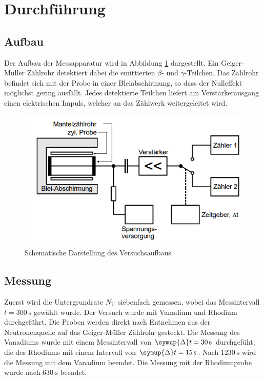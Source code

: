 \section{Durchführung}
\label{sec:Durchführung}
\subsection{Aufbau}
Der Aufbau der Messapparatur wird in Abbildung \ref{fig:auf} dargestellt. Ein Geiger-Müller Zählrohr detektiert dabei die emittierten $\beta$- und $\gamma$-Teilchen.
Das Zählrohr befindet sich mit der Probe in einer Bleiabschirmung, so dass der Nulleffekt möglichst gering ausfällt. Jedes detektierte Teilchen liefert am Verstärkerausgang einen elektrischen Impuls, welcher an das Zählwerk weitergeleitet wird.  
\begin{figure}
    \centering
    \includegraphics[scale=0.6]{content/Aufbau.png}
    \caption{Schematische Darstellung des Versuchsaufbaus \cite{v703}}
    \label{fig:auf}
  \end{figure}
  \subsection{Messung}
  Zuerst wird die Untergrundrate $N_\text{U}$ siebenfach gemessen, wobei das Messintervall $t=\SI{300}{\second}$ gewählt wurde. 
  Der Versuch wurde mit Vanadium und Rhodium durchgeführt. Die Proben werden direkt nach Entnehmen aus der Neutronenquelle auf das Geiger-Müller Zählrohr gesteckt.
  Die Messung des Vanadiums wurde mit einem Messintervall von $\symup{\Delta}t=\SI{30}{\second}$ durchgefüht;
  die des Rhodiums mit einem Intervall von $\symup{\Delta}t=\SI{15}{\second}$. Nach $\SI{1230}{\second}$ wird die Messung mit dem Vanadium beendet.
  Die Messung mit der Rhodiumprobe wurde nach $\SI{630}{\second}$ beendet.